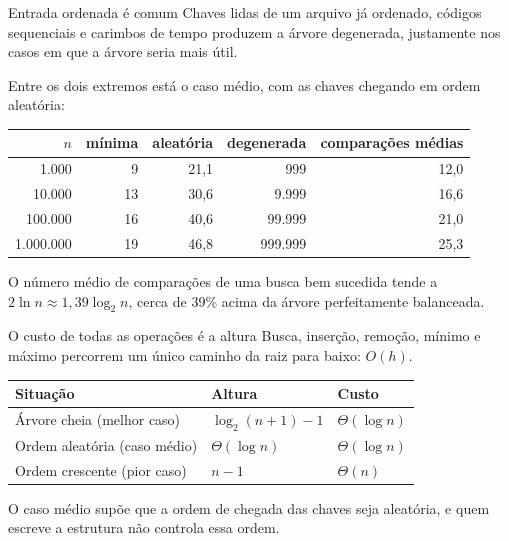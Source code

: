 \documentclass{beamer}
\begin{document}
\begin{frame}{Entrada ordenada é comum}
  Chaves lidas de um arquivo já ordenado, códigos sequenciais e carimbos de
  tempo produzem a árvore degenerada, justamente nos casos em que a árvore
  seria mais útil.

  \vspace{0.5cm}
  Entre os dois extremos está o caso médio, com as chaves chegando em ordem
  aleatória:

  \vspace{0.3cm}
  \begin{center}
    \footnotesize
    \begin{tabular}{rrrrr}
      \toprule
      $n$ & mínima & aleatória & degenerada & comparações médias \\
      \midrule
      1.000 & 9 & 21,1 & 999 & 12,0 \\
      10.000 & 13 & 30,6 & 9.999 & 16,6 \\
      100.000 & 16 & 40,6 & 99.999 & 21,0 \\
      1.000.000 & 19 & 46,8 & 999.999 & 25,3 \\
      \bottomrule
    \end{tabular}
  \end{center}

  \vspace{0.3cm}
  O número médio de comparações de uma busca bem sucedida tende a
  $2 \ln n \approx 1{,}39 \log_2 n$, cerca de 39\% acima da árvore
  perfeitamente balanceada.
\end{frame}

\begin{frame}{O custo de todas as operações é a altura}
  Busca, inserção, remoção, mínimo e máximo percorrem um único caminho da raiz
  para baixo: $O(h)$.

  \vspace{0.4cm}
  \begin{center}
    \footnotesize
    \begin{tabular}{lll}
      \toprule
      \textbf{Situação} & \textbf{Altura} & \textbf{Custo} \\
      \midrule
      Árvore cheia (melhor caso) & $\log_2(n+1) - 1$ & $\Theta(\log n)$ \\
      Ordem aleatória (caso médio) & $\Theta(\log n)$ & $\Theta(\log n)$ \\
      Ordem crescente (pior caso) & $n - 1$ & $\Theta(n)$ \\
      \bottomrule
    \end{tabular}
  \end{center}

  \vspace{0.5cm}
  O caso médio supõe que a ordem de chegada das chaves seja aleatória, e quem
  escreve a estrutura não controla essa ordem.
\end{frame}
\end{document}
